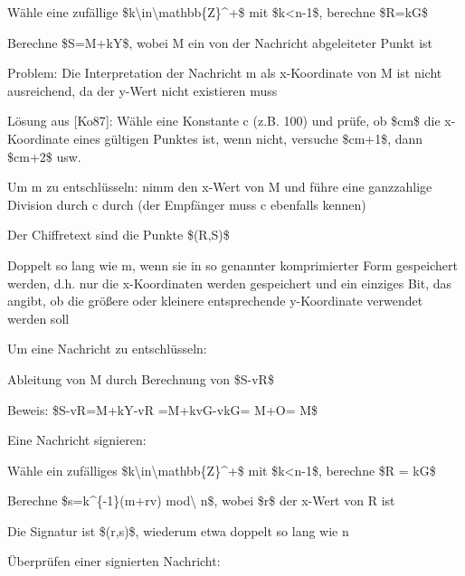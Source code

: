 \documentclass[a4paper]{article}
\begin{document}
\begin{multicols}{3}
\begin{itemize*}
            \begin{itemize*}
                  \item Wähle eine zufällige \$k\textbackslash in\textbackslash mathbb\{Z\}\^{}+\$ mit \$k\textless n-1\$, berechne \$R=kG\$
                  \item Berechne \$S=M+kY\$, wobei M ein von der Nachricht abgeleiteter Punkt ist
                  \begin{itemize*} \item Problem: Die Interpretation der Nachricht m als x-Koordinate von M ist nicht ausreichend, da der y-Wert nicht existieren muss \item Lösung aus {[}Ko87{]}: Wähle eine Konstante c (z.B. 100) und prüfe, ob \$cm\$ die x-Koordinate eines gültigen Punktes ist, wenn nicht, versuche \$cm+1\$, dann \$cm+2\$ usw. \item Um m zu entschlüsseln: nimm den x-Wert von M und führe eine ganzzahlige Division durch c durch (der Empfänger muss c ebenfalls kennen) \end{itemize*}
                  \item Der Chiffretext sind die Punkte \$(R,S)\$
                  \item Doppelt so lang wie m, wenn sie in so genannter komprimierter Form gespeichert werden, d.h. nur die x-Koordinaten werden gespeichert und ein einziges Bit, das angibt, ob die größere oder kleinere entsprechende y-Koordinate verwendet werden soll
            \end{itemize*}
            \item
            Um eine Nachricht zu entschlüsseln:

            \begin{itemize*}
                  \item Ableitung von M durch Berechnung von \$S-vR\$
                  \item Beweis: \$S-vR=M+kY-vR =M+kvG-vkG= M+O= M\$
            \end{itemize*}
            \item
            Eine Nachricht signieren:

            \begin{itemize*}
                  \item Wähle ein zufälliges \$k\textbackslash in\textbackslash mathbb\{Z\}\^{}+\$ mit \$k\textless n-1\$, berechne \$R = kG\$
                  \item Berechne \$s=k\^{}\{-1\}(m+rv) mod\textbackslash{} n\$, wobei \$r\$ der x-Wert von R ist
                  \item Die Signatur ist \$(r,s)\$, wiederum etwa doppelt so lang wie n
            \end{itemize*}
            \item
            Überprüfen einer signierten Nachricht:


\end{itemize*}
\end{multicols}
\end{document}
